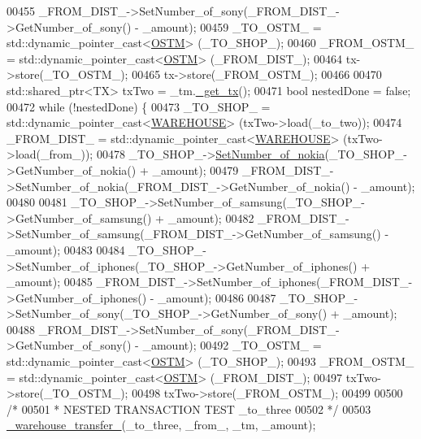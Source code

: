 \begin{DoxyCode}
00455             \_FROM\_DIST\_->SetNumber\_of\_sony(\_FROM\_DIST\_->GetNumber\_of\_sony() - \_amount);
00459             \_TO\_OSTM\_ = std::dynamic\_pointer\_cast<\hyperlink{class_o_s_t_m}{OSTM}> (\_TO\_SHOP\_);
00460             \_FROM\_OSTM\_ = std::dynamic\_pointer\_cast<\hyperlink{class_o_s_t_m}{OSTM}> (\_FROM\_DIST\_);
00464             tx->store(\_TO\_OSTM\_);
00465             tx->store(\_FROM\_OSTM\_);
00466 
00470             std::shared\_ptr<TX> txTwo = \_tm.\hyperlink{class_t_m_a41cb0226cc4080c931651b13f74a0075_a41cb0226cc4080c931651b13f74a0075}{\_get\_tx}();
00471             \textcolor{keywordtype}{bool} nestedDone = \textcolor{keyword}{false};
00472             \textcolor{keywordflow}{while} (!nestedDone) \{
00473                 \_TO\_SHOP\_ = std::dynamic\_pointer\_cast<\hyperlink{class_w_a_r_e_h_o_u_s_e}{WAREHOUSE}> (txTwo->load(\_to\_two));
00474                 \_FROM\_DIST\_ = std::dynamic\_pointer\_cast<\hyperlink{class_w_a_r_e_h_o_u_s_e}{WAREHOUSE}> (txTwo->load(\_from\_));
00478                 \_TO\_SHOP\_->\hyperlink{class_w_a_r_e_h_o_u_s_e_a300d1fe21a47e45c0d5d27e25add346f_a300d1fe21a47e45c0d5d27e25add346f}{SetNumber\_of\_nokia}(\_TO\_SHOP\_->GetNumber\_of\_nokia() + \_amount);
00479                 \_FROM\_DIST\_->SetNumber\_of\_nokia(\_FROM\_DIST\_->GetNumber\_of\_nokia() - \_amount);
00480 
00481                 \_TO\_SHOP\_->SetNumber\_of\_samsung(\_TO\_SHOP\_->GetNumber\_of\_samsung() + \_amount);
00482                 \_FROM\_DIST\_->SetNumber\_of\_samsung(\_FROM\_DIST\_->GetNumber\_of\_samsung() - \_amount);
00483 
00484                 \_TO\_SHOP\_->SetNumber\_of\_iphones(\_TO\_SHOP\_->GetNumber\_of\_iphones() + \_amount);
00485                 \_FROM\_DIST\_->SetNumber\_of\_iphones(\_FROM\_DIST\_->GetNumber\_of\_iphones() - \_amount);
00486 
00487                 \_TO\_SHOP\_->SetNumber\_of\_sony(\_TO\_SHOP\_->GetNumber\_of\_sony() + \_amount);
00488                 \_FROM\_DIST\_->SetNumber\_of\_sony(\_FROM\_DIST\_->GetNumber\_of\_sony() - \_amount);
00492                 \_TO\_OSTM\_ = std::dynamic\_pointer\_cast<\hyperlink{class_o_s_t_m}{OSTM}> (\_TO\_SHOP\_);
00493                 \_FROM\_OSTM\_ = std::dynamic\_pointer\_cast<\hyperlink{class_o_s_t_m}{OSTM}> (\_FROM\_DIST\_);
00497                 txTwo->store(\_TO\_OSTM\_);
00498                 txTwo->store(\_FROM\_OSTM\_);
00499 
00500                 \textcolor{comment}{/*}
00501 \textcolor{comment}{                 * NESTED TRANSACTION TEST \_to\_three}
00502 \textcolor{comment}{                 */}
00503                 \hyperlink{main_8cpp_a1c170f18aac9dbb8aba1ad2f7e4619cc_a1c170f18aac9dbb8aba1ad2f7e4619cc}{\_warehouse\_transfer\_}(\_to\_three, \_from\_, \_tm, \_amount);

\end{DoxyCode}
